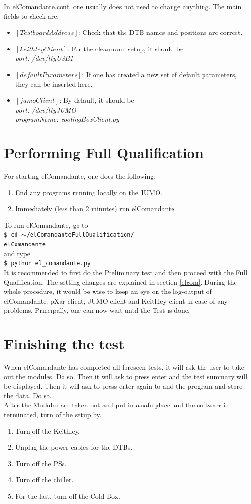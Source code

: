 \documentclass[fleqn,10pt]{SelfArx} %
\newcommand{\shellcmd}[1]{\\\indent\indent\texttt{\footnotesize\$ #1}\\}
\begin{document}
In elComandante.conf, one usually does not need to change anything. The main fields to check are:
\begin{itemize}
\item $[TestboardAddress]$: Check that the DTB names and positions are correct.
\item $[keithleyClient]$: For the cleanroom setup, it should be\\
{\it port: /dev/ttyUSB1}
\item $[defaultParameters]$: If one has created a new set of default parameters, they can be inserted here.
\item $[jumoClient]$: By default, it should be\\
{\it port: /dev/ttyJUMO\\programName: coolingBoxClient.py}
\end{itemize}

\section{Performing Full Qualification}
For starting elComandante, one does the following:
\begin{enumerate}
\item End any programs running locally on the JUMO. 
\item Immediately (less than 2 minutes) run elComandante.
\end{enumerate}
To run elComandante, go to 
\shellcmd{cd $\sim$/elComandanteFullQualification/ \\ elComandante}
and type
\shellcmd{python el\_comandante.py}

It is recommended to first do the Preliminary test and then proceed with the Full Qualification. The setting changes are explained in section \ref{elcom}. During the whole procedure, it would be wise to keep an eye on the log-output of elComandante, pXar client, JUMO client and Keithley client in case of any problems. Principally, one can now wait until the Test is done. 

\section{Finishing the test}
When elComandante has completed all foreseen tests, it will ask the user to take out the modules. Do so. Then it will ask to press enter and the test summary will be displayed. Then it will ask to press enter again to and the program and store the data. Do so. \\
After the Modules are taken out and put in a safe place and the software is terminated, turn of the setup by.
\begin{enumerate}
\item Turn off the Keithley.
\item Unplug the power cables for the DTBs.
\item Turn off the PSs.
\item Turn off the chiller.
\item For the last, turn off the Cold Box.
\end{enumerate}
\end{document}
